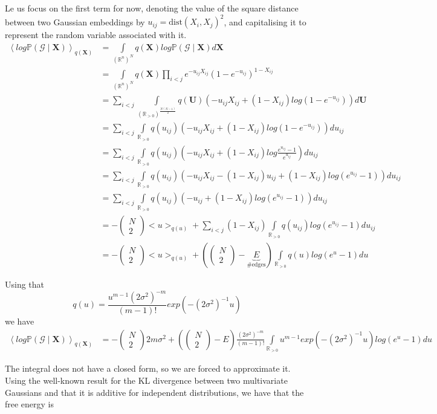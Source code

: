 \documentclass[12pt]{report}
\newcommand{\bs}{\boldsymbol}
\newcommand{\mc}[1]{\mathcal{#1}}
\newcommand{\mb}[1]{\mathbb{#1}}
\newcommand{\suml}[1]{\sum\limits_{#1}}
\newcommand{\prodl}[1]{\prod\limits_{#1}}
\newcommand{\ub}{\underbrace}
\newcommand{\comb}[2]{\begin{pmatrix}#1 \\ #2\end{pmatrix}}
\renewcommand{\bs}{\boldsymbol}
\begin{document}
Le us focus on the first term for now, denoting the value of the square distance between two Gaussian embeddings by $u_{ij} = \text{dist}(X_i, X_j)^2$, and capitalising it to represent the random variable associated with it.
\begin{align*}
    \left<log\mb{P}(\mc{G} \mid \bs{X})\right>_{q(\bs{X})} &= \int\limits_{(\mb{R}^n)^N} q(\bs{X})log\mb{P}(\mc{G} \mid \bs{X}) d\bs{X} \\
    &= \int\limits_{(\mb{R}^n)^N} q(\bs{X}) \prodl{i<j} e^{-u_{ij}X_{ij}}(1 - e^{-u_{ij}})^{1 - X_{ij}} \\
    &= \suml{i<j}\int\limits_{(\mb{R}_{>0})^\frac{N(N-1)}{2}} q(\bs{U}) (-u_{ij}X_{ij} + (1 - X_{ij})log(1 - e^{-u_{ij}})) d\bs{U} \\
    &= \suml{i<j}\int\limits_{\mb{R}_{>0}} q(u_{ij}) (-u_{ij}X_{ij} + (1 - X_{ij})log(1 - e^{-u_{ij}})) du_{ij} \\
    &= \suml{i<j}\int\limits_{\mb{R}_{>0}} q(u_{ij}) \left(-u_{ij}X_{ij} + (1 - X_{ij})log\frac{e^{u_{ij}} - 1}{e^{u_{ij}}}\right) du_{ij} \\
    &= \suml{i<j}\int\limits_{\mb{R}_{>0}} q(u_{ij}) (-u_{ij}X_{ij} - (1 - X_{ij})u_{ij} + (1 - X_{ij})log(e^{u_{ij}} - 1)) du_{ij} \\
    &= \suml{i<j}\int\limits_{\mb{R}_{>0}} q(u_{ij}) (-u_{ij} + (1 - X_{ij})log(e^{u_{ij}} - 1)) du_{ij} \\
    &= -\comb{N}{2}<u>_{q(u)} + \suml{i<j}(1 - X_{ij})\int\limits_{\mb{R}_{>0}} q(u_{ij}) log(e^{u_{ij}} - 1) du_{ij} \\
    &= -\comb{N}{2}<u>_{q(u)} + \left(\comb{N}{2} - \ub{E}_{\text{\#edges}}\right)\int\limits_{\mb{R}_{>0}} q(u) log(e^{u} - 1) du
\end{align*}

Using that
\begin{equation*}
    q(u) = \frac{u^{m-1}(2\sigma^2)^{-m}}{(m-1)!}exp(-(2\sigma^2)^{-1}u)
\end{equation*}
we have
\begin{align*}
    \left<log\mb{P}(\mc{G} \mid \bs{X})\right>_{q(\bs{X})} &= -\comb{N}{2}2m\sigma^2 + \left(\comb{N}{2} - E\right)\frac{(2\sigma^2)^{-m}}{(m-1)!}\int\limits_{\mb{R}_{>0}} u^{m-1}exp(-(2\sigma^2)^{-1}u) log(e^{u} - 1) du
\end{align*}

The integral does not have a closed form, so we are forced to approximate it. Using the well-known result for the KL divergence between two multivariate Gaussians and that it is additive for independent distributions, we have that the free energy is
\end{document}
